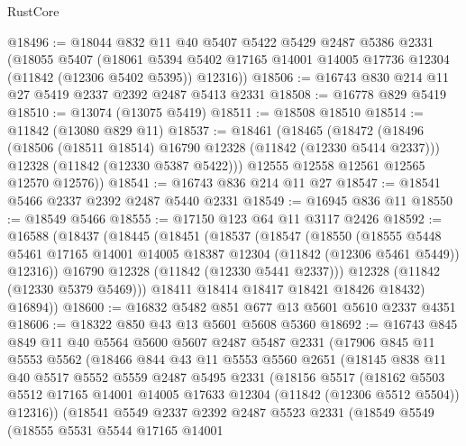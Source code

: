 \begin{lexlean}{RustCore}
\begin{coremodule}
@18496 := @18044
    @832
    @11
    @40
    @5407
    @5422
    @5429
    @2487
    @5386
    @2331
    (@18055
      @5407
      (@18061 @5394 @5402 @17165 @14001 @14005 @17736 @12304 (@11842 (@12306 @5402 @5395)) @12316))
@18506 := @16743 @830 @214 @11 @27 @5419 @2337 @2392 @2487 @5413 @2331
@18508 := @16778 @829 @5419
@18510 := @13074 (@13075 @5419)
@18511 := @18508 @18510
@18514 := @11842 (@13080 @829 @11)
@18537 := @18461
    (@18465
      (@18472
        (@18496
          (@18506 (@18511 @18514) @16790 @12328 (@11842 (@12330 @5414 @2337)))
          @12328
          (@11842 (@12330 @5387 @5422)))
        @12555
        @12558
        @12561
        @12565
        @12570
        @12576))
@18541 := @16743 @836 @214 @11 @27
@18547 := @18541 @5466 @2337 @2392 @2487 @5440 @2331
@18549 := @16945 @836 @11
@18550 := @18549 @5466
@18555 := @17150 @123 @64 @11 @3117 @2426
@18592 := @16588
    (@18437
      (@18445
        (@18451
          (@18537
            (@18547
              (@18550
                (@18555
                  @5448
                  @5461
                  @17165
                  @14001
                  @14005
                  @18387
                  @12304
                  (@11842 (@12306 @5461 @5449))
                  @12316))
              @16790
              @12328
              (@11842 (@12330 @5441 @2337)))
            @12328
            (@11842 (@12330 @5379 @5469)))
          @18411
          @18414
          @18417
          @18421
          @18426
          @18432)
        @16894))
@18600 := @16832 @5482 @851 @677 @13 @5601 @5610 @2337 @4351
@18606 := @18322 @850 @43 @13 @5601 @5608 @5360
@18692 := @16743
    @845
    @849
    @11
    @40
    @5564
    @5600
    @5607
    @2487
    @5487
    @2331
    (@17906
      @845
      @11
      @5553
      @5562
      (@18466
        @844
        @43
        @11
        @5553
        @5560
        @2651
        (@18145
          @838
          @11
          @40
          @5517
          @5552
          @5559
          @2487
          @5495
          @2331
          (@18156
            @5517
            (@18162
              @5503
              @5512
              @17165
              @14001
              @14005
              @17633
              @12304
              (@11842 (@12306 @5512 @5504))
              @12316))
          (@18541
            @5549
            @2337
            @2392
            @2487
            @5523
            @2331
            (@18549
              @5549
              (@18555
                @5531
                @5544
                @17165
                @14001

\end{coremodule}
\end{lexlean}
